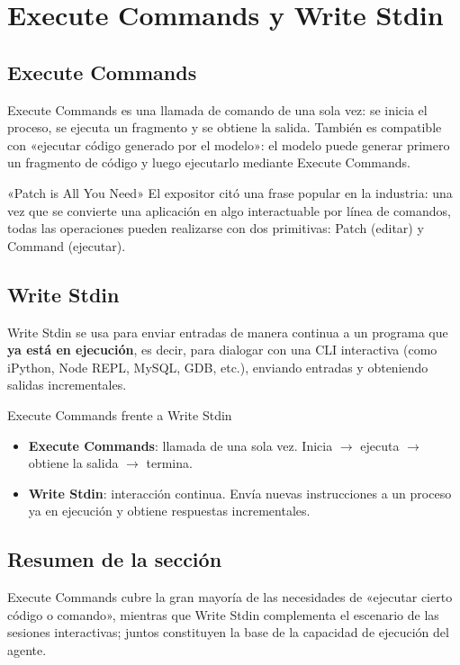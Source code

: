 \section{Execute Commands y Write Stdin}

\subsection{Execute Commands}

Execute Commands es una llamada de comando de una sola vez: se inicia el proceso, se ejecuta un fragmento y se obtiene la salida. También es compatible con «ejecutar código generado por el modelo»: el modelo puede generar primero un fragmento de código y luego ejecutarlo mediante Execute Commands.

\begin{knowledgebox}{«Patch is All You Need»}
El expositor citó una frase popular en la industria: una vez que se convierte una aplicación en algo interactuable por línea de comandos, todas las operaciones pueden realizarse con dos primitivas: Patch (editar) y Command (ejecutar).
\end{knowledgebox}

\subsection{Write Stdin}

Write Stdin se usa para enviar entradas de manera continua a un programa que \textbf{ya está en ejecución}, es decir, para dialogar con una CLI interactiva (como iPython, Node REPL, MySQL, GDB, etc.), enviando entradas y obteniendo salidas incrementales.

\begin{importantbox}{Execute Commands frente a Write Stdin}
\begin{itemize}
    \item \textbf{Execute Commands}: llamada de una sola vez. Inicia $\rightarrow$ ejecuta $\rightarrow$ obtiene la salida $\rightarrow$ termina.
    \item \textbf{Write Stdin}: interacción continua. Envía nuevas instrucciones a un proceso ya en ejecución y obtiene respuestas incrementales.
\end{itemize}
\end{importantbox}

\subsection{Resumen de la sección}

Execute Commands cubre la gran mayoría de las necesidades de «ejecutar cierto código o comando», mientras que Write Stdin complementa el escenario de las sesiones interactivas; juntos constituyen la base de la capacidad de ejecución del agente.

